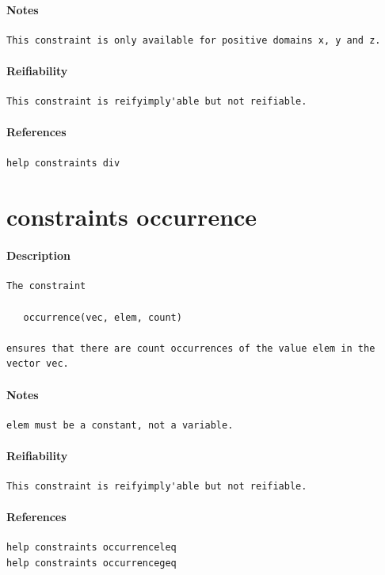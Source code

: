 \documentclass[oneside]{book}
\begin{document}
\paragraph{Notes}
{\footnotesize
\begin{verbatim}
This constraint is only available for positive domains x, y and z.
\end{verbatim}
}
\paragraph{Reifiability}
{\footnotesize
\begin{verbatim}
This constraint is reifyimply'able but not reifiable.
\end{verbatim}
}
\paragraph{References}
{\footnotesize
\begin{verbatim}
help constraints div
\end{verbatim}
}
\section{constraints occurrence}
\paragraph{Description}
{\footnotesize
\begin{verbatim}
The constraint

   occurrence(vec, elem, count)

ensures that there are count occurrences of the value elem in the
vector vec.
\end{verbatim}
}
\paragraph{Notes}
{\footnotesize
\begin{verbatim}
elem must be a constant, not a variable.
\end{verbatim}
}
\paragraph{Reifiability}
{\footnotesize
\begin{verbatim}
This constraint is reifyimply'able but not reifiable.
\end{verbatim}
}
\paragraph{References}
{\footnotesize
\begin{verbatim}
help constraints occurrenceleq
help constraints occurrencegeq
\end{verbatim}
}
\end{document}
